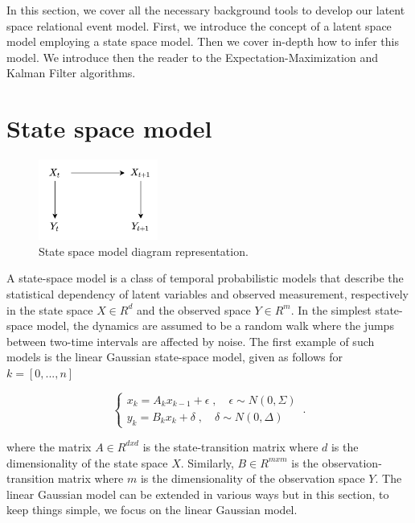 \documentclass[mscthesis]{usiinfthesis}
\begin{document}
In this section, we cover all the necessary background tools to develop our latent space relational event model. First, we introduce the concept of a latent space model employing a state space model. Then we cover in-depth how to infer this model. We introduce then the reader to the Expectation-Maximization and Kalman Filter algorithms. 

\section{State space model}
\label{sec:latent_space}

\begin{figure}[H]
    \centering
    \includegraphics[width=0.35\textwidth]{statespace_diagram.png}
    \caption{State space model diagram representation.}
    \label{fig:statespace_diagram}
\end{figure}

A state-space model is a class of temporal probabilistic models that describe the statistical dependency of latent variables and observed measurement, respectively in the state space $X \in R^d$ and the observed space $Y \in R^m$. In the simplest state-space model, the dynamics are assumed to be a random walk where the jumps between two-time intervals are affected by noise. The first example of such models is the linear Gaussian state-space model, given as follows for $k = [0, ..., n]$

\begin{eqfloat}
\begin{equation}
    \begin{cases}
      x_k = A_k x_{k-1} + \epsilon \; , \quad \epsilon \sim N(0, \Sigma) \\
      y_k = B_k x_k + \delta  \; , \quad \delta \sim N(0, \Delta) 
    \end{cases}\,.
\label{eq:statespace}
\end{equation}
\end{eqfloat}

\noindent where the matrix $A \in R^{dxd}$ is the state-transition matrix where $d$ is the dimensionality of the state space $X$. Similarly, $B \in R^{mxm}$ is the observation-transition matrix where $m$ is the dimensionality of the observation space $Y$. The linear Gaussian model can be extended in various ways but in this section, to keep things simple, we focus on the linear Gaussian model. 
\end{document}
